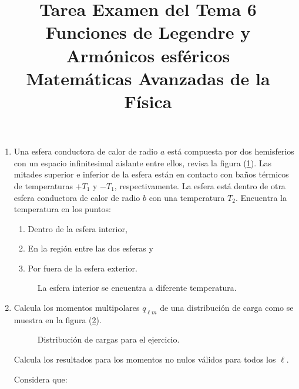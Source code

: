 
\author{}
\title{Tarea Examen del Tema 6  \\ \large{Funciones de Legendre y Armónicos esféricos\\ Matemáticas Avanzadas de la Física}} \vspace{-1.5\baselineskip}
\date{ }

\vspace{-4cm}
\renewcommand\labelenumii{\theenumi.{\arabic{enumii})}}
\maketitle
\fontsize{14}{14}\selectfont
\begin{enumerate}
\item Una esfera conductora de calor de radio $a$ está compuesta por dos hemisferios con un espacio infinitesimal aislante entre ellos, revisa la figura (\ref{fig:figura2}). Las mitades superior e inferior de la esfera están en contacto con baños térmicos de temperaturas $+ T_{1}$ y $-T_{1}$, respectivamente. La esfera está dentro de otra esfera conductora de calor de radio $b$ con una temperatura $T_{2}$. Encuentra la temperatura en los puntos:
\begin{enumerate}
\item Dentro de la esfera interior,
\item En la región entre las dos esferas y
\item Por fuera de la esfera exterior.
\end{enumerate} 
\begin{figure}[!ht]
    \centering
    
    \caption{La esfera interior se encuentra a diferente temperatura.}
    \label{fig:figura2}
\end{figure}
\item Calcula los momentos multipolares $q_{\ell m}$ de una distribución de carga como se muestra en la figura (\ref{fig:figura_multipolo_01}).
\begin{figure}[!ht]
    \centering
    
    \caption{Distribución de cargas para el ejercicio.}
    \label{fig:figura_multipolo_01}
\end{figure}
Calcula los resultados para los momentos no nulos válidos para todos los $\ell$.
\par
Considera que:
\begin{enumerate}

\end{enumerate}
\end{enumerate}
